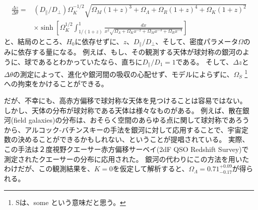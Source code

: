 \documentclass[11pt]{ltjsarticle}
\theoremstyle{plain}
\theoremstyle{break}
\begin{document}
\begin{align}
  \frac{\Delta z}{\Delta \theta}
    =&\left(D_{ \|} / D_{\perp}\right) \Omega_{K}^{-1 / 2} \sqrt{\Omega_{M}(1+z)^{3}+\Omega_{\Lambda}+\Omega_{R}(1+z)^{4}+\Omega_{K}(1+z)^{2}} \\
     &\times \sinh \left[\Omega_{K}^{1 / 2} \int_{1 /(1+z)}^{1} \frac{d x}{x^{2} \sqrt{\Omega_{\Lambda}+\Omega_{K} x^{-2}+\Omega_{M} x^{-3}+\Omega_{R} x^{-4}}}\right]
\end{align}%
と、結局のところ、$H_0$に依存せずに、$z$、$D_{\parallel}/D_{\perp}$、そして、密度パラメータ$\Omega$のみに依存する量になる。
例えば、もし、その観測する天体が球対称の銀河のように、球であるとわかっていたなら、直ちに$D_{ \parallel} / D_{1}=1$である。
そして、$\Delta z$と$\Delta \theta$の測定によって、進化や銀河間の吸収の心配せず、モデルによらずに、$\Omega_{S}$ \footnote{Sは、some という意味だと思う。}への拘束をかけることができる。


だが、不幸にも、高赤方偏移で球対称な天体を見つけることは容易ではない。
しかし、天体の分布が球対称である天体は様々なものがある。
例えば、散在銀河(field galaxies)の分布は、おそらく空間のあらゆる点に関して球対称であろうから、アルコック-バチンスキーの手法を銀河に対して応用することで、宇宙定数の決めることができるかもしれない、ということが提唱されている。
実際、この手法は２度視野クエーサー赤方偏移サーベイ(2dF QSO Redshift Survey)で測定されたクエーサーの分布に応用された。
銀河の代わりにこの方法を用いたわけだが、この観測結果を、$K=0$を仮定して解析すると、$\Omega_{\Lambda}  = 0.71^{+0.09}_{-0.17}$が得られる。
\end{document}
